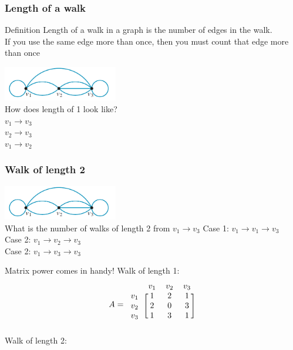 \documentclass[
	11pt, %
]{beamer}
\begin{document}
\begin{frame}[t]
    \frametitle{Length of a walk}
    \begin{block}{Definition}
        Length of a walk in a graph is the number of edges in the walk.\\
        If you use the same edge more than once, then you must count that edge more than once
    \end{block}
    \includegraphics[width = 5cm]{Length.png}\\
    How does length of 1 look like?\\
    $v_1 \rightarrow v_3$\\
    $v_2 \rightarrow v_3$\\
    $v_1 \rightarrow v_2$\\
\end{frame}

\begin{frame}[t]
    \frametitle{Walk of length 2}
    \includegraphics[width = 5cm]{Length.png}\\
    What is the number of walks of length 2 from $v_1 \rightarrow v_3$
    Case 1: $v_1 \rightarrow v_1 \rightarrow v_3$\\
    Case 2: $v_1 \rightarrow v_2 \rightarrow v_3$\\
    Case 2: $v_1 \rightarrow v_3 \rightarrow v_3$\\
    
\end{frame}

\begin{frame}{Matrix power comes in handy!}
    Walk of length 1:
    \[A =
        \begin{blockarray}{cccc}
            & v_1 & v_2 & v_3\\
            \begin{block}{c[ccc]}
                v_1 & 1 & 2 & 1\\
                v_2 & 2 & 0 & 3\\
                v_3 & 1 & 3 & 1\\
            \end{block}
        \end{blockarray}
    \]
    \bigskip
    Walk of length 2:
\end{frame}
\end{document}
